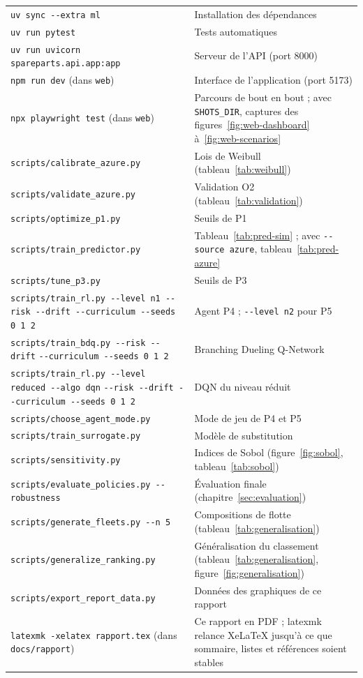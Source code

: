 \documentclass[11pt,a4paper,oneside]{report}
\newcommand{\hd}[1]{\leavevmode{\sffamily\bfseries\color{primaire}#1}}
\begin{document}
\begin{tabularx}{\linewidth}{@{}P{7.2cm} L@{}}
\toprule
\hd{Commande} & \hd{Résultat} \\
\midrule
\texttt{uv sync -{}-extra ml} & Installation des dépendances \\
\texttt{uv run pytest} & Tests automatiques \\
\texttt{uv run uvicorn spareparts.api.app:app} & Serveur de l'API (port 8000) \\
\texttt{npm run dev} (dans \texttt{web}) & Interface de l'application (port 5173) \\
\texttt{npx playwright test} (dans \texttt{web}) & Parcours de bout en bout ; avec \texttt{SHOTS\_DIR}, captures des figures~\ref{fig:web-dashboard} à~\ref{fig:web-scenarios} \\
\texttt{scripts/calibrate\_azure.py} & Lois de Weibull (tableau~\ref{tab:weibull}) \\
\texttt{scripts/validate\_azure.py} & Validation O2 (tableau~\ref{tab:validation}) \\
\texttt{scripts/optimize\_p1.py} & Seuils de P1 \\
\texttt{scripts/train\_predictor.py} & Tableau~\ref{tab:pred-sim} ; avec \texttt{-{}-source azure}, tableau~\ref{tab:pred-azure} \\
\texttt{scripts/tune\_p3.py} & Seuils de P3 \\
\texttt{scripts/train\_rl.py -{}-level n1 -{}-risk -{}-drift -{}-curriculum -{}-seeds 0 1 2} & Agent P4 ; \texttt{-{}-level n2} pour P5 \\
\texttt{scripts/train\_bdq.py -{}-risk -{}-drift} \newline \texttt{-{}-curriculum -{}-seeds 0 1 2} & Branching Dueling Q-Network \\
\texttt{scripts/train\_rl.py -{}-level reduced -{}-algo dqn} \newline \texttt{-{}-risk -{}-drift -{}-curriculum -{}-seeds 0 1 2} & DQN du niveau réduit \\
\texttt{scripts/choose\_agent\_mode.py} & Mode de jeu de P4 et P5 \\
\texttt{scripts/train\_surrogate.py} & Modèle de substitution \\
\texttt{scripts/sensitivity.py} & Indices de Sobol (figure~\ref{fig:sobol}, tableau~\ref{tab:sobol}) \\
\texttt{scripts/evaluate\_policies.py -{}-robustness} & Évaluation finale (chapitre~\ref{sec:evaluation}) \\
\texttt{scripts/generate\_fleets.py -{}-n 5} & Compositions de flotte (tableau~\ref{tab:generalisation}) \\
\texttt{scripts/generalize\_ranking.py} & Généralisation du classement (tableau~\ref{tab:generalisation}, figure~\ref{fig:generalisation}) \\
\texttt{scripts/export\_report\_data.py} & Données des graphiques de ce rapport \\
\texttt{latexmk -xelatex rapport.tex} (dans \texttt{docs/rapport}) & Ce rapport en PDF ; latexmk relance XeLaTeX jusqu'à ce que sommaire, listes et références soient stables \\
\bottomrule
\end{tabularx}
\end{document}
